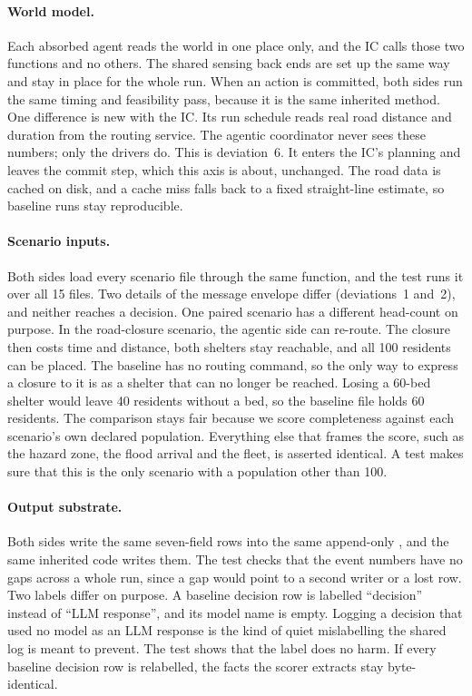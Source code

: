 \paragraph{World model.} Each absorbed agent reads the world in one place only,
and the IC calls those two functions and no others. The shared sensing back
ends are set up the same way and stay in place for the whole run. When an
action is committed, both sides run the same timing and feasibility pass,
because it is the same inherited method. One difference is new with the IC.
Its run schedule reads real road distance and duration from the routing
service. The agentic coordinator never sees these numbers; only the drivers do.
This is deviation~6. It enters the IC's planning and leaves the commit step,
which this axis is about, unchanged. The road data is cached on disk, and a
cache miss falls back to a fixed straight-line estimate, so baseline runs stay
reproducible.

\paragraph{Scenario inputs.} Both sides load every scenario file through the
same function, and the test runs it over all 15 files. Two details of the
message envelope differ (deviations~1 and~2), and neither reaches a decision.
One paired scenario has a different head-count on purpose. In the road-closure
scenario, the agentic side can re-route. The closure then costs time and
distance, both shelters stay reachable, and all 100 residents can be placed.
The baseline has no routing command, so the only way to express a closure to
it is as a shelter that can no longer be reached. Losing a 60-bed shelter would
leave 40 residents without a bed, so the baseline file holds 60 residents. The
comparison stays fair because we score completeness against each scenario's
own declared population. Everything else that frames the score, such as the
hazard zone, the flood arrival and the fleet, is asserted identical. A test
makes sure that this is the only scenario with a population other than 100.

\paragraph{Output substrate.} Both sides write the same seven-field rows into
the same append-only , and the same inherited code writes them.
The test checks that the event numbers have no gaps across a whole run, since a
gap would point to a second writer or a lost row. Two labels differ on purpose.
A baseline decision row is labelled ``decision'' instead of ``LLM response'',
and its model name is empty. Logging a decision that used no model as an LLM
response is the kind of quiet mislabelling the shared log is meant to prevent.
The test shows that the label does no harm. If every baseline decision row is
relabelled, the facts the scorer extracts stay byte-identical.

